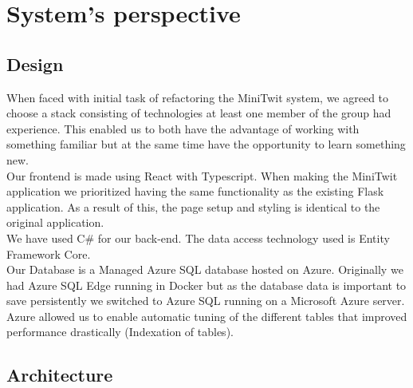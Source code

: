 \section{System's perspective}
\subsection{Design}
When faced with initial task of refactoring the MiniTwit system, we agreed to choose a stack consisting of technologies at least one member of the group had experience.
This enabled us to both have the advantage of working with something familiar but at the same time have the opportunity to learn something new. \\
Our frontend is made using React with Typescript. When making the MiniTwit application we prioritized having the same functionality as the existing Flask application. As a result of this, the page setup and styling is identical to the original application.\\
We have used C\# for our back-end. The data access technology used is Entity Framework Core. \\
Our Database is a Managed Azure SQL database hosted on Azure. Originally we had Azure SQL Edge running in Docker but as the database data is important to save persistently we switched to Azure SQL running on a Microsoft Azure server. Azure allowed us to enable automatic tuning of the different tables that improved performance drastically (Indexation of tables).\\



\subsection{Architecture}


